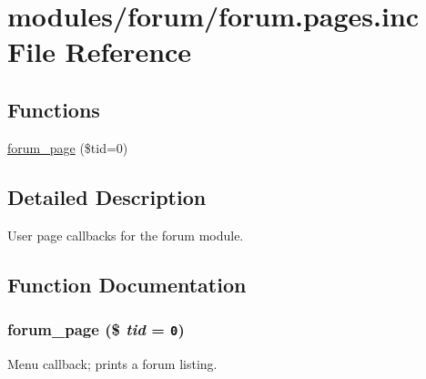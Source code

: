 \hypertarget{forum_8pages_8inc}{
\section{modules/forum/forum.pages.inc File Reference}
\label{forum_8pages_8inc}
}
\subsection*{Functions}
\begin{CompactItemize}
\item 
\hyperlink{forum_8pages_8inc_8342c0350bd28d9fbdaf39b33aed3253}{forum\_\-page} (\$tid=0)
\end{CompactItemize}


\subsection{Detailed Description}
User page callbacks for the forum module. 

\subsection{Function Documentation}
\hypertarget{forum_8pages_8inc_8342c0350bd28d9fbdaf39b33aed3253}{
\subsubsection[{forum\_\-page}]{\setlength{\rightskip}{0pt plus 5cm}forum\_\-page (\$ {\em tid} = {\tt 0})}}
\label{forum_8pages_8inc_8342c0350bd28d9fbdaf39b33aed3253}


Menu callback; prints a forum listing. 